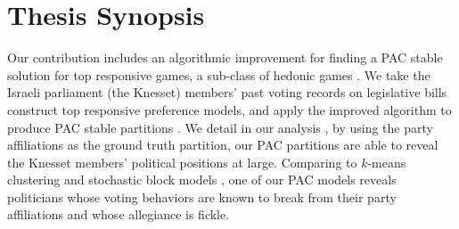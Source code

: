 \section{Thesis Synopsis}
Our contribution includes an algorithmic improvement for finding a PAC stable solution for top responsive games, a sub-class of hedonic games
.  We take the Israeli parliament (the Knesset) members' past voting records on legislative bills 
construct top responsive preference models, and apply the improved algorithm to produce PAC stable partitions
.  We detail in our analysis 
, by using the party affiliations as the ground truth partition,
our PAC partitions are able to reveal the Knesset members' political positions at large. 
Comparing to $k$-means clustering and stochastic block models 
, one of our PAC models reveals politicians whose voting behaviors are known to break from their party affiliations and whose allegiance is fickle.

